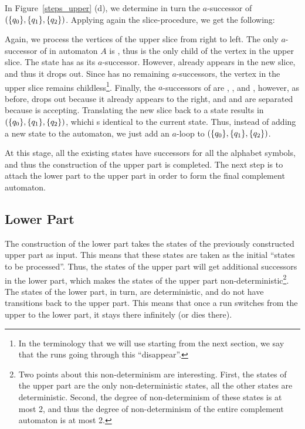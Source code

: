 In Figure~\ref{steps_upper} (d), we determine in turn the $a$-successor of $(\{q_{0}\}, \{q_{1}\}, \{q_{2}\})$. Applying again the slice-procedure, we get the following:

\SlicesThree

Again, we process the vertices of the upper slice from right to left. The only $a$-successor of  in automaton $A$ is , thus  is the only child of the vertex  in the upper slice. The state  has  as its $a$-successor. However,  already appears in the new slice, and thus it drops out. Since  has no remaining $a$-successors, the vertex  in the upper slice remains childless\footnote{In the terminology that we will use starting from the next section, we say that the runs going through this  ``disappear''.}. Finally, the $a$-successors of  are , , and , however, as before,  drops out because it already appears to the right, and  and  are separated because  is accepting. Translating the new slice back to a state results in $(\{q_{0}\}, \{q_{1}\}, \{q_{2}\})$, whichi s identical to the current state. Thus, instead of adding a new state to the automaton, we just add an $a$-loop to $(\{q_{0}\}, \{q_{1}\}, \{q_{2}\})$.

At this stage, all the existing states have successors for all the alphabet symbols, and thus the construction of the upper part is completed. The next step is to attach the lower part to the upper part in order to form the final complement automaton.



\subsection{Lower Part}
The construction of the lower part takes the states of the previously constructed upper part as input. This means that these states are taken as the initial ``states to be processed''. Thus, the states of the upper part will get additional successors in the lower part, which makes the states of the upper part non-deterministic\footnote{Two points about this non-determinism are interesting. First, the states of the upper part are the only non-deterministic states, all the other states are deterministic. Second, the degree of non-determinism of these states is at most 2, and thus the degree of non-determinism of the entire complement automaton is at most 2.}. The states of the lower part, in turn, are deterministic, and do not have transitions back to the upper part. This means that once a run switches from the upper to the lower part, it stays there infinitely (or dies there). 

